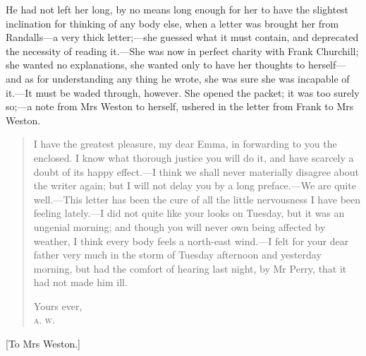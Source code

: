 He had not left her long, by no means long enough for her to have the slightest inclination for thinking of any body else, when a letter was brought her from Randalls—a very thick letter;—she guessed what it must contain, and deprecated the necessity of reading it.—She was now in perfect charity with Frank Churchill; she wanted no explanations, she wanted only to have her thoughts to herself—and as for understanding any thing he wrote, she was sure she was incapable of it.—It must be waded through, however. She opened the packet; it was too surely so;—a note from Mrs Weston to herself, ushered in the letter from Frank to Mrs Weston.

\begin{quotation}
\indent I have the greatest pleasure, my dear Emma, in forwarding to you the enclosed. I know what thorough justice you will do it, and have scarcely a doubt of its happy effect.—I think we shall never materially disagree about the writer again; but I will not delay you by a long preface.—We are quite well.—This letter has been the cure of all the little nervousness I have been feeling lately.—I did not quite like your looks on Tuesday, but it was an ungenial morning; and though you will never own being affected by weather, I think every body feels a north-east wind.—I felt for your dear father very much in the storm of Tuesday afternoon and yesterday morning, but had the comfort of hearing last night, by Mr Perry, that it had not made him ill.
\begin{flushright}
Yours ever,\\
\textsc{a. w.}
\end{flushright}
\end{quotation}

[To Mrs Weston.]

